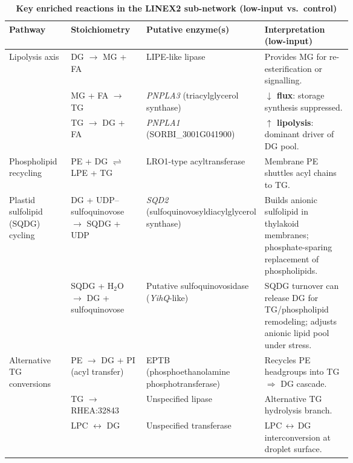 \documentclass[10pt,letterpaper]{article}
\begin{document}
\begin{table}[!ht]
  \centering
  \footnotesize
  \setlength{\tabcolsep}{4pt}
  \renewcommand{\arraystretch}{1.2}
  \caption{\textbf{Key enriched reactions in the LINEX2 sub-network (low-input vs.\ control)}}
  \label{tab:linex_reactions}
  \begin{tabularx}{\linewidth}{@{}%
      p{0.18\linewidth}
      p{0.22\linewidth}
      p{0.26\linewidth}
      X
    @{}}
    \toprule
    \textbf{Pathway} & \textbf{Stoichiometry} & \textbf{Putative enzyme(s)} & \textbf{Interpretation (low-input)} \\
    \midrule
    Lipolysis axis
      & DG $\rightarrow$ MG + FA
      & LIPE-like lipase
      & Provides MG for re-esterification or signalling. \\
    & MG + FA $\rightarrow$ TG
      & \textit{PNPLA3} (triacylglycerol synthase)
      & \textbf{$\downarrow$ flux}: storage synthesis suppressed. \\
    & TG $\rightarrow$ DG + FA
      & \textit{PNPLA1} (SORBI\_3001G041900)
      & \textbf{$\uparrow$ lipolysis}: dominant driver of DG pool. \\
    \addlinespace
    Phospholipid recycling
      & PE + DG $\rightleftharpoons$ LPE + TG
      & LRO1-type acyltransferase
      & Membrane PE shuttles acyl chains to TG. \\
    \addlinespace
    Plastid sulfolipid (SQDG) cycling
      & DG + UDP–sulfoquinovose $\rightarrow$ SQDG + UDP
      & \textit{SQD2} (sulfoquinovosyldiacylglycerol synthase)
      & Builds anionic sulfolipid in thylakoid membranes; phosphate-sparing replacement of phospholipids. \\
    & SQDG + H$_2$O $\rightarrow$ DG + sulfoquinovose
      & Putative sulfoquinovosidase (\textit{YihQ}-like)
      & SQDG turnover can release DG for TG/phospholipid remodeling; adjusts anionic lipid pool under stress. \\
    \addlinespace
    Alternative TG conversions
      & PE $\rightarrow$ DG + PI (acyl transfer)
      & EPTB (phosphoethanolamine phosphotransferase)
      & Recycles PE headgroups into TG $\Rightarrow$ DG cascade. \\
    & TG $\rightarrow$ RHEA:32843
      & Unspecified lipase
      & Alternative TG hydrolysis branch. \\
    & LPC $\leftrightarrow$ DG
      & Unspecified transferase
      & LPC\,$\leftrightarrow$\,DG interconversion at droplet surface. \\
    \bottomrule
  \end{tabularx}
\end{table}
\end{document}
